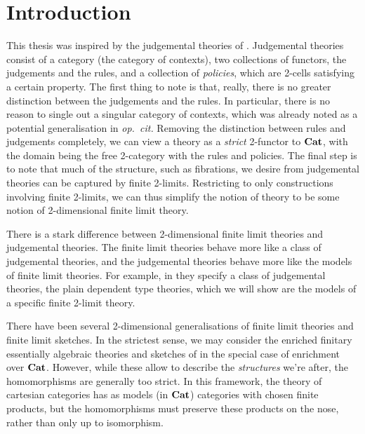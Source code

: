 \documentclass[../thesis.tex]{subfiles}
\begin{document}
  \chapter{Introduction}
  This thesis was inspired by the judgemental theories of \cite{coraglia2024a}. Judgemental theories consist of
  a category (the category of contexts), two collections of functors, the judgements and the rules, and a
  collection of \emph{policies}, which are 2-cells satisfying a certain property. The first thing to note
  is that, really, there is no greater distinction between the judgements and the rules. In particular, there
  is no reason to single out a singular category of contexts, which was already noted as a potential
  generalisation in \emph{op.\ cit.} Removing the distinction between rules and judgements completely, we
  can view a theory as a \emph{strict} 2-functor to ${\mathbf{Cat}}$, with the domain being the free 2-category with
  the rules and policies. The final step is to note that much of the structure, such as fibrations, we desire
  from judgemental theories can be captured by finite 2-limits. Restricting to only constructions involving
  finite 2-limits, we can thus simplify the notion of theory to be some notion of 2-dimensional finite limit
  theory.

  \begin{remark}
    There is a stark difference between 2-dimensional finite limit theories and judgemental theories. The finite
    limit theories behave more like a class of judgemental theories, and the judgemental theories behave more
    like the models of finite limit theories. For example, in \cite{coraglia2024a} they specify a class of
    judgemental theories, the plain dependent type theories, which we will show are the models of a specific
    finite 2-limit theory.
  \end{remark}

  There have been several 2-dimensional generalisations of finite limit theories and finite limit sketches. In
  the strictest sense, we may consider the enriched finitary essentially algebraic theories and sketches of
  \cite{kelly1982b} in the special case of enrichment over ${\mathbf{Cat}}$. However, while these allow to describe the
  \emph{structures} we're after, the homomorphisms are generally too strict. In this framework, the theory of
  cartesian categories has as models (in ${\mathbf{Cat}}$) categories with chosen finite products, but the homomorphisms
  must preserve these products on the nose, rather than only up to isomorphism. 
  
\end{document}
